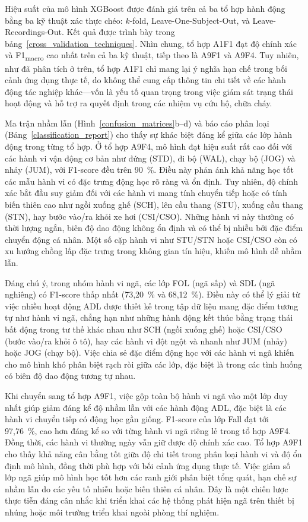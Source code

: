 Hiệu suất của mô hình XGBoost được đánh giá trên cả ba tổ hợp hành động bằng ba kỹ thuật xác thực chéo: $k$-fold, Leave-One-Subject-Out, và Leave-Recordings-Out. Kết quả được trình bày trong bảng~\ref{cross_validation_techniques}. Nhìn chung, tổ hợp A1F1 đạt độ chính xác và F1\textsubscript{macro} cao nhất trên cả ba kỹ thuật, tiếp theo là A9F1 và A9F4. Tuy nhiên, như đã phân tích ở trên, tổ hợp A1F1 chỉ mang lại ý nghĩa hạn chế trong bối cảnh ứng dụng thực tế, do không thể cung cấp thông tin chi tiết về các hành động tác nghiệp khác—vốn là yếu tố quan trọng trong việc giám sát trạng thái hoạt động và hỗ trợ ra quyết định trong các nhiệm vụ cứu hộ, chữa cháy.

Ma trận nhầm lẫn (Hình~\ref{confusion_matrices}b–d) và báo cáo phân loại (Bảng~\ref{classification_report}) cho thấy sự khác biệt đáng kể giữa các lớp hành động trong từng tổ hợp. Ở tổ hợp A9F4, mô hình đạt hiệu suất rất cao đối với các hành vi vận động cơ bản như đứng (STD), đi bộ (WAL), chạy bộ (JOG) và nhảy (JUM), với F1-score đều trên 90~\%. Điều này phản ánh khả năng học tốt các mẫu hành vi có đặc trưng động học rõ ràng và ổn định. Tuy nhiên, độ chính xác bắt đầu suy giảm đối với các hành vi mang tính chuyển tiếp hoặc có tính biến thiên cao như ngồi xuống ghế (SCH), lên cầu thang (STU), xuống cầu thang (STN), hay bước vào/ra khỏi xe hơi (CSI/CSO). Những hành vi này thường có thời lượng ngắn, biên độ dao động không ổn định và có thể bị nhiễu bởi đặc điểm chuyển động cá nhân. Một số cặp hành vi như STU/STN hoặc CSI/CSO còn có xu hướng chồng lấp đặc trưng trong không gian tín hiệu, khiến mô hình dễ nhầm lẫn.

Đáng chú ý, trong nhóm hành vi ngã, các lớp FOL (ngã sấp) và SDL (ngã nghiêng) có F1-score thấp nhất (73,20~\% và 68,12~\%). Điều này có thể lý giải từ việc nhiều hoạt động ADL được thiết kế trong tập dữ liệu mang đặc điểm tương tự như hành vi ngã, chẳng hạn như những hành động kết thúc bằng trạng thái bất động trong tư thế khác nhau như SCH (ngồi xuống ghế) hoặc CSI/CSO (bước vào/ra khỏi ô tô), hay các hành vi đột ngột và nhanh như JUM (nhảy) hoặc JOG (chạy bộ). Việc chia sẻ đặc điểm động học với các hành vi ngã khiến cho mô hình khó phân biệt rạch ròi giữa các lớp, đặc biệt là trong các tình huống có biên độ dao động tương tự nhau.

Khi chuyển sang tổ hợp A9F1, việc gộp toàn bộ hành vi ngã vào một lớp duy nhất giúp giảm đáng kể độ nhầm lẫn với các hành động ADL, đặc biệt là các hành vi chuyển tiếp có động học gần giống. F1-score của lớp Fall đạt tới 97,76~\%, cao hơn đáng kể so với từng hành vi ngã riêng lẻ trong tổ hợp A9F4. Đồng thời, các hành vi thường ngày vẫn giữ được độ chính xác cao. Tổ hợp A9F1 cho thấy khả năng cân bằng tốt giữa độ chi tiết trong phân loại hành vi và độ ổn định mô hình, đồng thời phù hợp với bối cảnh ứng dụng thực tế. Việc giảm số lớp ngã giúp mô hình học tốt hơn các ranh giới phân biệt tổng quát, hạn chế sự nhầm lẫn do các yếu tố nhiễu hoặc biến thiên cá nhân. Đây là một chiến lược thực tiễn đáng cân nhắc khi triển khai các hệ thống phát hiện ngã trên thiết bị nhúng hoặc môi trường triển khai ngoài phòng thí nghiệm.

